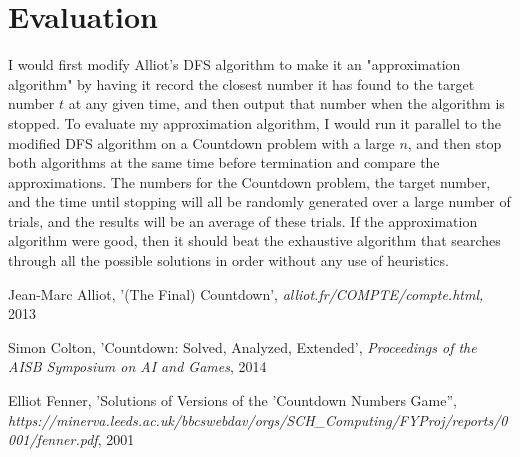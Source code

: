 \documentclass[12pt]{article}
\begin{document}
\section*{Evaluation}
 I would first modify Alliot's DFS algorithm \cite{J-M Alliot} to make it an "approximation algorithm" by having it record the closest number it has found to the target number $t$ at any given time, and then output that number when the algorithm is stopped. To evaluate my approximation algorithm, I would run it parallel to the modified DFS algorithm on a Countdown problem with a large $n$, and then stop both algorithms at the same time before termination and compare the approximations. The numbers for the Countdown problem, the target number, and the time until stopping will all be randomly generated over a large number of trials, and the results will be an average of these trials. If the approximation algorithm were good, then it should beat the exhaustive algorithm that searches through all the possible solutions in order without any use of heuristics. 

\begin{thebibliography}{9}
	Jean-Marc Alliot,
	'(The Final) Countdown',
	\textit{alliot.fr/COMPTE/compte.html,}
	2013
	
	Simon Colton,
	'Countdown: Solved, Analyzed, Extended',
	\textit{Proceedings
		of the AISB Symposium on AI and Games},
	2014
	
	Elliot Fenner,
	'Solutions of Versions of the 'Countdown Numbers Game'', 
	\textit{https://minerva.leeds.ac.uk/bbcswebdav/orgs/SCH\_Computing/FYProj/reports/0001/fenner.pdf},
	2001

\end{thebibliography}
\end{document}
